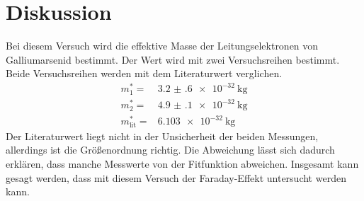 \section{Diskussion}
\label{sec:Diskussion}
Bei diesem Versuch wird die effektive Masse der Leitungselektronen von Galliumarsenid bestimmt.
Der Wert wird mit zwei Versuchsreihen bestimmt. 
Beide Versuchsreihen werden mit dem Literaturwert \cite{LitWert} verglichen.
\begin{align*}
    m^*_1 =& \SI{3.2(6)e-32}{\kilo\gram}\\
    m^*_2 =& \SI{4.9(1)e-32}{\kilo\gram}\\
    m^*_{\text{lit}}=& \SI{6.103e-32}{\kilo\gram}
\end{align*}
Der Literaturwert liegt nicht in der Unsicherheit der beiden Messungen, allerdings ist die Größenordnung richtig.
Die Abweichung lässt sich dadurch erklären, dass manche Messwerte von der Fitfunktion abweichen. Insgesamt kann gesagt werden, 
dass mit diesem Versuch der Faraday-Effekt untersucht werden kann.
\newpage
